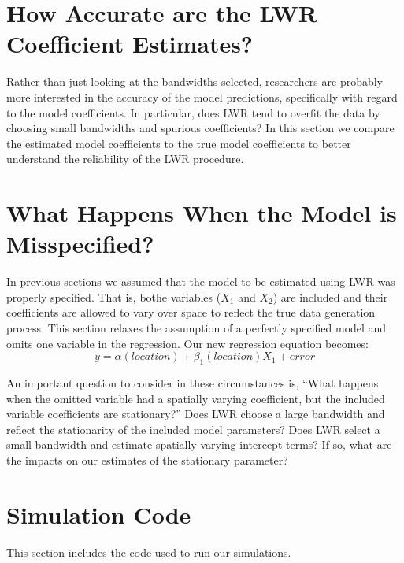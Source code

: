 \documentclass{article}\usepackage{graphicx, color}
\begin{document}
\section{How Accurate are the LWR Coefficient Estimates?}

Rather than just looking at the bandwidths selected, researchers are probably more interested in the accuracy of the model predictions, specifically with regard to the model coefficients. In particular, does LWR tend to overfit the data by choosing small bandwidths and spurious coefficients? In this section we compare the estimated model coefficients to the true model coefficients to better understand the reliability of the LWR procedure.


\section{What Happens When the Model is Misspecified?}

In previous sections we assumed that the model to be estimated using LWR was properly specified. That is, bothe variables ($X_1$ and $X_2$) are included and their coefficients are allowed to vary over space to reflect the true data generation process. This section relaxes the assumption of a perfectly specified model and omits one variable in the regression. Our new regression equation becomes:
\begin{equation}
y = \alpha (location) + \beta _1 (location) X_1 + error
\end{equation}

An important question to consider in these circumstances is, ``What happens when the omitted variable had a spatially varying coefficient, but the included variable coefficients are stationary?'' Does LWR choose a large bandwidth and reflect the stationarity of the included model parameters? Does LWR select a small bandwidth and estimate spatially varying intercept terms? If so, what are the impacts on our estimates of the stationary parameter?


\section{Simulation Code}
This section includes the code used to run our simulations.
\end{document}
